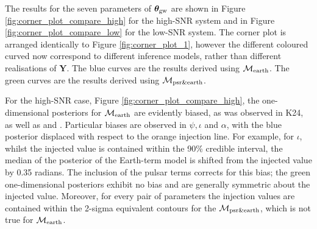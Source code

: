 \documentclass[fleqn,usenatbib,useAMS]{mnras}
\begin{document}
The results for the seven parameters of  $\boldsymbol{\theta}_{\rm gw}$ are shown in Figure \ref{fig:corner_plot_compare_high} for the high-SNR system and in Figure \ref{fig:corner_plot_compare_low} for the low-SNR system. The corner plot is arranged identically to Figure \ref{fig:corner_plot_1}, however the different coloured curved now correspond to different inference models, rather than different realisations of $\boldsymbol{Y}$. The blue curves are the results derived using $\mathcal{M}_{\rm earth}$. The green curves are the results derived using $\mathcal{M}_{\rm psr \& earth}$. \newline 
		
For the high-SNR case, Figure \ref{fig:corner_plot_compare_high}, the one-dimensional posteriors for $\mathcal{M}_{\rm earth}$ are evidently biased, as was observed in K24, as well as \cite{Zhupulsarterms} and \cite{Chen2022}. Particular biases are observed in $\psi, \iota $ and $\alpha$, with the blue posterior displaced with respect to the orange injection line. For example, for $\iota$, whilst the injected value is contained within the 90\% credible interval, the median of the posterior of the Earth-term model is shifted from the injected value by 0.35 radians. The inclusion of the pulsar terms corrects for this bias; the green one-dimensional posteriors exhibit no bias and are generally symmetric about the injected value. Moreover, for every pair of parameters the injection values are contained within the 2-sigma equivalent contours for the $\mathcal{M}_{\rm psr \& earth}$, which is not true for $\mathcal{M}_{\rm earth}$. \newline 
\end{document}
